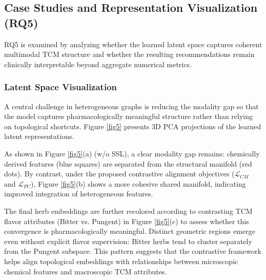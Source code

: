 \documentclass[a4paper,fleqn]{cas-dc}
\begin{document}




\subsection{Case Studies and Representation Visualization (RQ5)}

RQ5 is examined by analyzing whether the learned latent space captures coherent multimodal TCM structure and whether the resulting recommendations remain clinically interpretable beyond aggregate numerical metrics.

\subsubsection{Latent Space Visualization}
A central challenge in heterogeneous graphs is reducing the modality gap so that the model captures pharmacologically meaningful structure rather than relying on topological shortcuts. Figure \ref{fig5} presents 3D PCA projections of the learned latent representations.

As shown in Figure \ref{fig5}(a) (w/o SSL), a clear modality gap remains: chemically derived features (blue squares) are separated from the structural manifold (red dots). By contrast, under the proposed contrastive alignment objectives ($\mathcal{L}_{CM}$ and $\mathcal{L}_{PC}$), Figure \ref{fig5}(b) shows a more cohesive shared manifold, indicating improved integration of heterogeneous features.

The final herb embeddings are further recolored according to contrasting TCM flavor attributes (Bitter vs. Pungent) in Figure \ref{fig5}(c) to assess whether this convergence is pharmacologically meaningful. Distinct geometric regions emerge even without explicit flavor supervision: Bitter herbs tend to cluster separately from the Pungent subspace. This pattern suggests that the contrastive framework helps align topological embeddings with relationships between microscopic chemical features and macroscopic TCM attributes.
\end{document}
